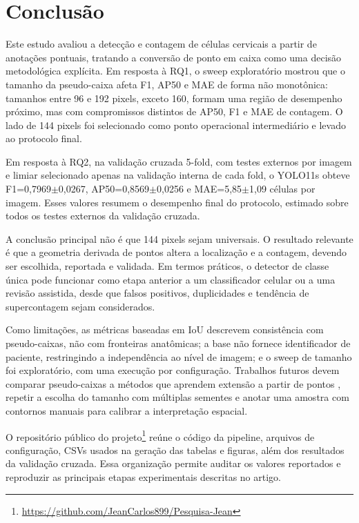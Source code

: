 \FloatBarrier
\section{Conclus\~ao}

Este estudo avaliou a detec\c{c}\~ao e contagem de c\'elulas cervicais a partir de
anota\c{c}\~oes pontuais, tratando a convers\~ao de ponto em caixa como uma decis\~ao
metodol\'ogica expl\'icita. Em resposta \`a RQ1, o sweep explorat\'orio mostrou que o
tamanho da pseudo-caixa afeta F1, AP50 e MAE de forma n\~ao monot\^onica: tamanhos entre
96 e 192 pixels, exceto 160, formam uma regi\~ao de desempenho pr\'oximo, mas com
compromissos distintos de AP50, F1 e MAE de contagem.
O lado de 144 pixels foi selecionado como ponto operacional intermedi\'ario e
levado ao protocolo final.

Em resposta \`a RQ2, na valida\c{c}\~ao cruzada 5-fold, com testes externos por imagem e
limiar selecionado apenas na valida\c{c}\~ao interna de cada fold, o YOLO11s obteve
F1=0,7969$\pm$0,0267, AP50=0,8569$\pm$0,0256 e MAE=5,85$\pm$1,09 c\'elulas por
imagem. Esses valores resumem o desempenho final do
protocolo, estimado sobre todos os testes externos da valida\c{c}\~ao cruzada.

A conclus\~ao principal n\~ao \'e que 144 pixels sejam universais. O resultado
relevante \'e que a geometria derivada de pontos altera a localiza\c{c}\~ao e a
contagem, devendo ser escolhida, reportada e validada. Em termos pr\'aticos, o
detector de classe \'unica pode funcionar como etapa anterior a um classificador
celular ou a uma revis\~ao assistida, desde que falsos positivos, duplicidades e
tend\^encia de supercontagem sejam considerados.

Como limita\c{c}\~oes, as m\'etricas baseadas em IoU descrevem consist\^encia com
pseudo-caixas, n\~ao com fronteiras anat\^omicas; a base n\~ao fornece
identificador de paciente, restringindo a independ\^encia ao n\'ivel de imagem; e
o sweep de tamanho foi explorat\'orio, com uma execu\c{c}\~ao por configura\c{c}\~ao.
Trabalhos futuros devem comparar pseudo-caixas a m\'etodos que aprendem
extens\~ao a partir de pontos \cite{chen2023p2bnet}, repetir a escolha do tamanho
com m\'ultiplas sementes e anotar uma amostra com contornos manuais para calibrar
a interpreta\c{c}\~ao espacial.

O reposit\'orio p\'ublico do projeto\footnote{\url{https://github.com/JeanCarlos899/Pesquisa-Jean}}
re\'une o c\'odigo da pipeline, arquivos de configura\c{c}\~ao, CSVs usados na
gera\c{c}\~ao das tabelas e figuras, al\'em dos resultados da valida\c{c}\~ao cruzada.
Essa organiza\c{c}\~ao permite auditar os valores reportados e reproduzir as
principais etapas experimentais descritas no artigo.
